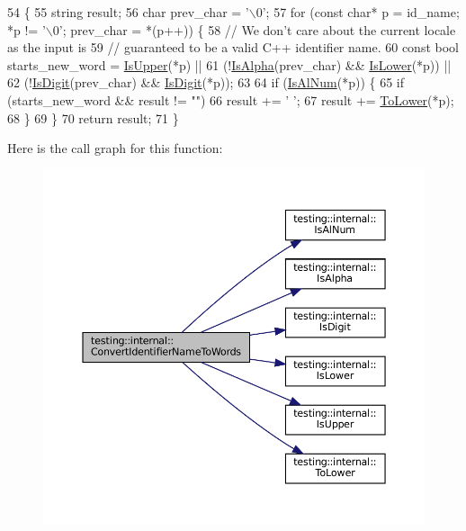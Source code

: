 \begin{DoxyCode}
54                                                                     \{
55   \textcolor{keywordtype}{string} result;
56   \textcolor{keywordtype}{char} prev\_char = \textcolor{charliteral}{'\(\backslash\)0'};
57   \textcolor{keywordflow}{for} (\textcolor{keyword}{const} \textcolor{keywordtype}{char}* p = id\_name; *p != \textcolor{charliteral}{'\(\backslash\)0'}; prev\_char = *(p++)) \{
58     \textcolor{comment}{// We don't care about the current locale as the input is}
59     \textcolor{comment}{// guaranteed to be a valid C++ identifier name.}
60     \textcolor{keyword}{const} \textcolor{keywordtype}{bool} starts\_new\_word = \hyperlink{namespacetesting_1_1internal_a84f3baa379fec6bf5947cb5165aa8cc9}{IsUpper}(*p) ||
61         (!\hyperlink{namespacetesting_1_1internal_aeb957087fd6bbf9db98ab7cd41b0c129}{IsAlpha}(prev\_char) && \hyperlink{namespacetesting_1_1internal_ac26ce3883bc8919c27074975e958f3b7}{IsLower}(*p)) ||
62         (!\hyperlink{namespacetesting_1_1internal_a4bd96b7fa6486802d33ddc217af55a39}{IsDigit}(prev\_char) && \hyperlink{namespacetesting_1_1internal_a4bd96b7fa6486802d33ddc217af55a39}{IsDigit}(*p));
63 
64     \textcolor{keywordflow}{if} (\hyperlink{namespacetesting_1_1internal_a83802e7f23324cd512232203662e1a98}{IsAlNum}(*p)) \{
65       \textcolor{keywordflow}{if} (starts\_new\_word && result != \textcolor{stringliteral}{""})
66         result += \textcolor{charliteral}{' '};
67       result += \hyperlink{namespacetesting_1_1internal_ad9c627ef2a94245e3fd69e7ab3d49b42}{ToLower}(*p);
68     \}
69   \}
70   \textcolor{keywordflow}{return} result;
71 \}
\end{DoxyCode}
Here is the call graph for this function\+:
\nopagebreak
\begin{figure}[H]
\begin{center}
\leavevmode
\includegraphics[width=350pt]{namespacetesting_1_1internal_a571db854f6de337007c53573c9cbf8a3_cgraph}
\end{center}
\end{figure}
